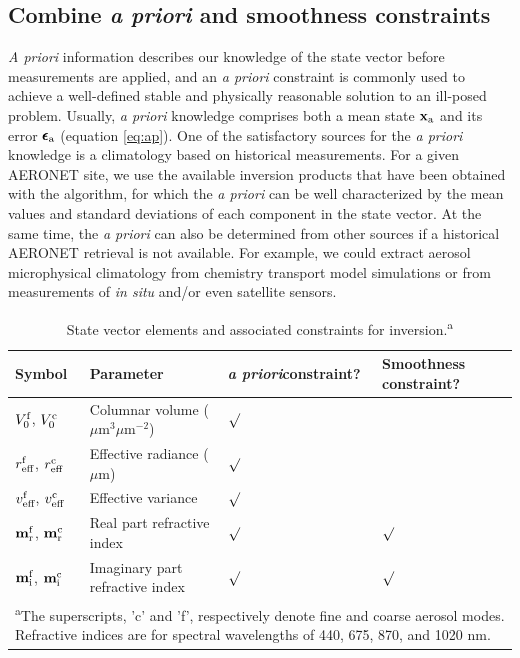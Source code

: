 \subsection{Combine \textit{a priori} and smoothness constraints}
\label{subsec:ap}

\textit{A priori} information describes our knowledge of the state vector
 before measurements are applied, and an \textit{a priori} constraint is 
commonly used to achieve a well-defined stable and physically reasonable 
solution to an ill-posed problem. Usually, \textit{a priori} knowledge comprises 
both a mean state $\mathbf{x}_\text{a}$ and its error $\pmb{\epsilon}_\text{a}$ (equation
\eqref{eq:ap}). One of the satisfactory sources for the \textit{a
priori} knowledge is a climatology based on historical measurements. For a given
AERONET site, we use the available inversion products that have been
obtained with the \Dub algorithm, for which the \textit{a priori} can be
well characterized by the mean values and standard deviations of each
component in the state vector. At the same time, the \textit{a priori} can also
be determined from other sources if a historical AERONET retrieval is not
available. For example, we could extract aerosol microphysical
climatology from chemistry transport model simulations
\citep[e.g.,][]{Wang10} or from measurements of \textit{in situ} and/or 
even satellite sensors.

\begin{table}[t]
  \centering
  \small
  \caption{State vector elements and associated constraints for
inversion.\textsuperscript{a}}
  \label{tab:xpars}
  \begin{tabular}{p{5em} p{15em} p{5em} p{5em} }
    \toprule
       Symbol & Parameter & \textit{a priori}\newline constraint? & Smoothness
constraint? \\
    \midrule
       $V_0^\text{f}$, $V_0^\text{c}$ & Columnar volume ($\mu$m$^3\mu$m$^{-2}$) & 
       $\surd$ & \\
       $r_\text{eff}^\text{f}$, $r_\text{eff}^\text{c}$ & Effective radiance ($\mu$m) &
       $\surd$ & \\
       $v_\text{eff}^\text{f}$, $v_\text{eff}^\text{c}$ & Effective variance  & $\surd$ & \\
       $\mathbf{m}_\text{r}^\text{f}$, $\mathbf{m}_\text{r}^\text{c}$ & 
       Real part refractive index & $\surd$ & $\surd$ \\
       $\mathbf{m}_\text{i}^\text{f}$, $\mathbf{m}_\text{i}^\text{c}$ &
       Imaginary part refractive index & $\surd$ & $\surd$ \\
    \bottomrule
    \multicolumn{4}{m{35em}}{\textsuperscript{a}The superscripts, 'c' and
'f', respectively denote fine and coarse aerosol modes. Refractive indices
are for spectral wavelengths of 440, 675, 870, and 1020 nm.}
  \end{tabular}
\end{table}

